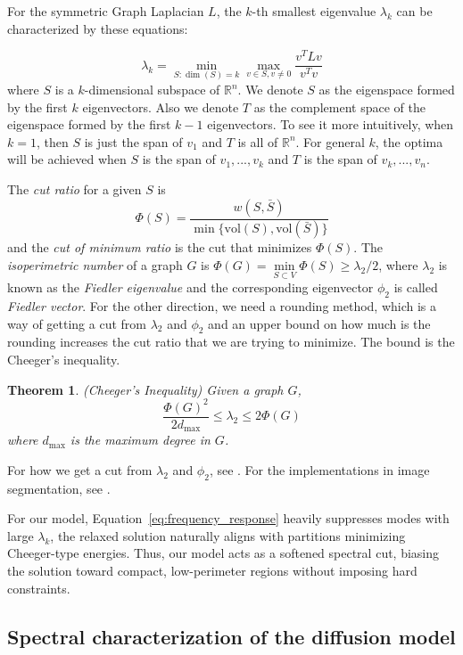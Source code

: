 \documentclass[11pt]{article}
\newtheorem{theorem}{Theorem}[section]
\begin{document}
For the symmetric Graph Laplacian $L$, the $k$-th smallest eigenvalue $\lambda_k$ can be characterized by these equations: 

\[
\lambda_k = \min_{S: \dim(S)=k} \max_{v \in S, v \neq 0} \frac{v^T L v}{v^T v}
\]
where $S$ is a $k$-dimensional subspace of $\mathbb{R}^n$. We denote $S$ as the eigenspace formed by the first $k$ eigenvectors. Also we denote $T$ as the complement space of the eigenspace formed by the first $k-1$ eigenvectors. To see it more intuitively, when $k = 1$, then $S$ is just the span of $v_1$ and $T$ is all of $\mathbb{R}^n$. For general $k$, the optima will be achieved when $S$ is the span of $v_1,...,v_k$ and $T$ is the span of $v_k,...,v_n$.

The \textit{cut ratio} for a given $S$ is
\[
    \Phi(S) = \frac{w(S, \bar{S})}{\min\{\mathrm{vol}(S),\mathrm{vol}(\bar{S})\}}
\]
and the \textit{cut of minimum ratio} is the cut that minimizes $\Phi(S)$. The \textit{isoperimetric number} of a graph $G$ is $\Phi(G) = \min\limits_{S \subset V} \Phi(S) \geq \lambda_2/2$, where $\lambda_2$ is known as the \textit{Fiedler eigenvalue} and the corresponding eigenvector $\phi_2$ is called \textit{Fiedler vector}. For the other direction, we need a rounding method, which is a way of getting a cut from $\lambda_2$ and $\phi_2$ and an upper bound on how much is the rounding increases the cut ratio that we are trying to minimize. The bound is the Cheeger's inequality.
\begin{theorem}(Cheeger's Inequality)
    Given a graph $G$,
    \[
    \frac{\Phi(G)^2}{2d_{\max}} \leq \lambda_2 \leq 2 \Phi(G)
    \]
    where $d_{\max}$ is the maximum degree in $G$.
\end{theorem}
For how we get a cut from $\lambda_2$ and $\phi_2$, see \cite{kelner2009spectral}. For the implementations in image segmentation, see \cite{spielman2007spectral, merkurjev2013mbo}.
  
For our model, Equation~\eqref{eq:frequency_response} heavily suppresses modes with large $\lambda_k$, the relaxed solution naturally aligns with partitions minimizing Cheeger-type energies. Thus, our model acts as a softened spectral cut, biasing the solution toward compact, low-perimeter regions without imposing hard constraints.

\subsection{Spectral characterization of the diffusion model}\label{sec:charecterization}
\end{document}
